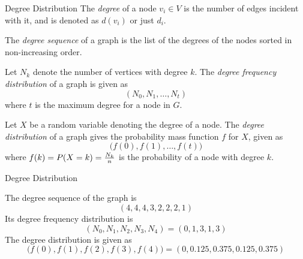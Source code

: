 \begin{frame}{Degree Distribution}
The {\em degree} of a node $v_i \in V$ is the
number of edges incident with it, and is denoted as $d(v_i)$ or just
$d_i$. 

\medskip
The
{\em degree sequence} of a graph is the list of the degrees of
the nodes sorted in non-increasing order.

\medskip
Let $N_k$ denote the
number of vertices with degree $k$.
The {\em degree frequency distribution} of a graph is given as
$$(N_0, N_1, \ldots, N_t)$$
where $t$ is the maximum degree for a node in $G$.

\medskip
Let $X$ be a random variable denoting the degree of a node.
The {\em degree distribution} of a graph gives the
probability mass function $f$ for $X$, given as
$$\bigl(f(0), f(1), \ldots, f(t)\bigr)$$
where $f(k) = P(X=k) = {N_k\over n}$ is the probability of a
node with degree $k$.
\end{frame}

\begin{frame}{Degree Distribution}
\centerline{
} 
\bigskip
    The degree sequence of the graph is
    $$(4, 4, 4, 3, 2, 2, 2, 1)$$
    Its degree frequency distribution
    is
    $$(N_0, N_1, N_2, N_3, N_4) = (0, 1, 3, 1, 3)$$
	The degree
    distribution is given as
    $$\bigl(f(0), f(1), f(2), f(3), f(4)\bigr) = (0, 0.125, 0.375, 0.125, 0.375)$$

\end{frame}



